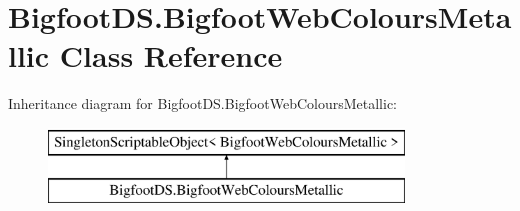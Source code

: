 \hypertarget{class_bigfoot_d_s_1_1_bigfoot_web_colours_metallic}{}\section{Bigfoot\+D\+S.\+Bigfoot\+Web\+Colours\+Metallic Class Reference}
\label{class_bigfoot_d_s_1_1_bigfoot_web_colours_metallic}
Inheritance diagram for Bigfoot\+D\+S.\+Bigfoot\+Web\+Colours\+Metallic\+:\begin{figure}[H]
\begin{center}
\leavevmode
\includegraphics[height=2.000000cm]{class_bigfoot_d_s_1_1_bigfoot_web_colours_metallic}
\end{center}
\end{figure}
